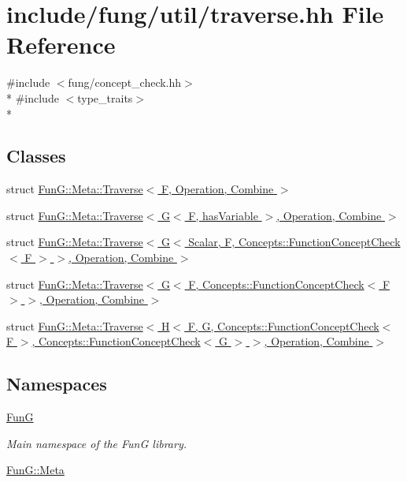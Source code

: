 \hypertarget{traverse_8hh}{\section{include/fung/util/traverse.hh File Reference}
\label{traverse_8hh}
}
{\ttfamily \#include $<$fung/concept\-\_\-check.\-hh$>$}\\*
{\ttfamily \#include $<$type\-\_\-traits$>$}\\*
\subsection*{Classes}
\begin{DoxyCompactItemize}
\item 
struct \hyperlink{structFunG_1_1Meta_1_1Traverse}{Fun\-G\-::\-Meta\-::\-Traverse$<$ F, Operation, Combine $>$}
\item 
struct \hyperlink{structFunG_1_1Meta_1_1Traverse_3_01G_3_01F_00_01hasVariable_01_4_00_01Operation_00_01Combine_01_4}{Fun\-G\-::\-Meta\-::\-Traverse$<$ G$<$ F, has\-Variable $>$, Operation, Combine $>$}
\item 
struct \hyperlink{structFunG_1_1Meta_1_1Traverse_3_01G_3_01Scalar_00_01F_00_01Concepts_1_1FunctionConceptCheck_3_056d96032cb56cdcfc81b282c6fc44c83}{Fun\-G\-::\-Meta\-::\-Traverse$<$ G$<$ Scalar, F, Concepts\-::\-Function\-Concept\-Check$<$ F $>$ $>$, Operation, Combine $>$}
\item 
struct \hyperlink{structFunG_1_1Meta_1_1Traverse_3_01G_3_01F_00_01Concepts_1_1FunctionConceptCheck_3_01F_01_4_01_473eb79b17eeedd14b27190d68eb8ea5c}{Fun\-G\-::\-Meta\-::\-Traverse$<$ G$<$ F, Concepts\-::\-Function\-Concept\-Check$<$ F $>$ $>$, Operation, Combine $>$}
\item 
struct \hyperlink{structFunG_1_1Meta_1_1Traverse_3_01H_3_01F_00_01G_00_01Concepts_1_1FunctionConceptCheck_3_01F_013370ce68fd07becd92320937a020c699}{Fun\-G\-::\-Meta\-::\-Traverse$<$ H$<$ F, G, Concepts\-::\-Function\-Concept\-Check$<$ F $>$, Concepts\-::\-Function\-Concept\-Check$<$ G $>$ $>$, Operation, Combine $>$}
\end{DoxyCompactItemize}
\subsection*{Namespaces}
\begin{DoxyCompactItemize}
\item 
\hyperlink{namespaceFunG}{Fun\-G}
\begin{DoxyCompactList}\small\item\em Main namespace of the Fun\-G library. \end{DoxyCompactList}\item 
\hyperlink{namespaceFunG_1_1Meta}{Fun\-G\-::\-Meta}
\end{DoxyCompactItemize}
